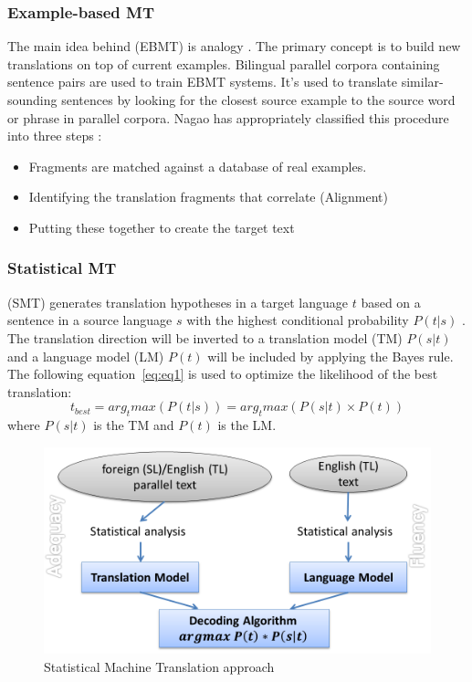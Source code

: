 \subsubsection{\textbf{Example-based MT}}
The main idea behind (EBMT) is analogy \cite{Nagao84}. The primary concept is to build new translations on top of current examples. Bilingual parallel corpora containing sentence pairs are used to train EBMT systems. It's used to translate similar-sounding sentences by looking for the closest source example to the source word or phrase in parallel corpora. Nagao has appropriately classified this procedure into three steps \cite{Nagao84}:
\begin{itemize}
	\item Fragments are matched against a database of real examples.
	\item Identifying the translation fragments that correlate (Alignment)
	\item Putting these together to create the target text
\end{itemize}

\subsubsection{\textbf{Statistical MT}}
(SMT) generates translation hypotheses in a target language $t$ based on a sentence in a source language $s$ with the highest conditional probability $P(t|s)$ \cite{brown88,brown93}. The translation direction will be inverted to a translation model (TM) $P(s|t)$ and a language model (LM) $P(t)$ will be included by applying the Bayes rule. The following equation~\eqref{eq:eq1} is used to optimize the likelihood of the best translation:
\begin{equation}
	\label{eq:eq1}
	t_{best}=arg_{t}max(P(t|s))=arg_{t}max(P(s|t) \times P(t))
\end{equation}
where $P(s|t)$ is the TM and $P(t)$ is the LM.

\begin{figure}[htbp]
	\centerline{\includegraphics[scale=0.3]{Figures/fig1.13.png}}
	\caption{Statistical Machine Translation approach}
	\label{fig1.13.png}
\end{figure}

